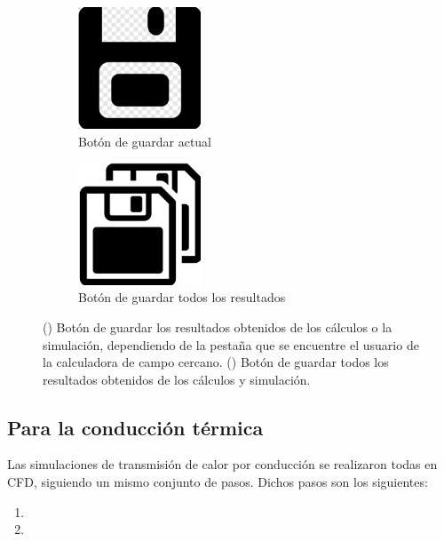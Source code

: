 \begin{figure}[H]
	\centering
	\begin{subfigure}[b]{0.48\textwidth}
		\centering
		\includegraphics[width=0.4\textwidth]{figuras/Procedimiento_Simulaciones/Radiacion/SaveButton_Cut.jpg}
		\caption{Botón de guardar actual}
		\label{fig:SaveButton_Cut}
	\end{subfigure}
  \hfill
	\begin{subfigure}[b]{0.48\textwidth}
		\centering
			\includegraphics[width=0.40\textwidth]{figuras/Procedimiento_Simulaciones/Radiacion/SaveAllicon.jpg}
		\caption{Botón de guardar todos los resultados}
		\label{fig:SaveAllicon}
	\end{subfigure}
	\caption{() Botón de guardar los resultados obtenidos de los cálculos o la simulación, dependiendo de la pestaña que se encuentre el usuario de la calculadora de campo cercano. () Botón de guardar todos los resultados obtenidos de los cálculos y simulación.}
	\label{fig:saveButtons}
\end{figure}
\subsection{Para la conducción térmica}
Las simulaciones de transmisión de calor por conducción se realizaron todas en CFD, siguiendo un mismo conjunto de pasos. Dichos pasos son los siguientes:
\begin{enumerate}
	\item 
	\item
\end{enumerate}
